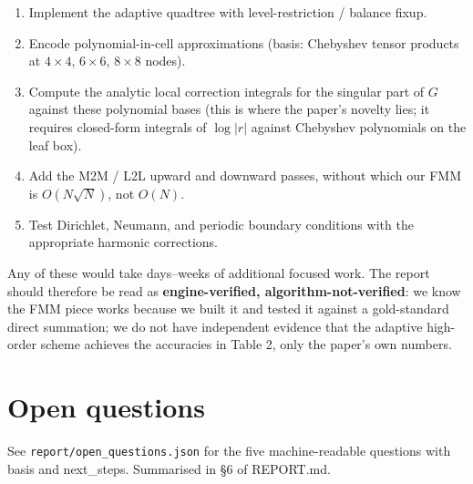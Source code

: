 \documentclass[11pt]{article}
\begin{document}
\begin{enumerate}
\item Implement the adaptive quadtree with level-restriction / balance fixup.
\item Encode polynomial-in-cell approximations (basis: Chebyshev tensor
      products at $4 \times 4$, $6 \times 6$, $8 \times 8$ nodes).
\item Compute the analytic local correction integrals for the singular
      part of $G$ against these polynomial bases (this is where the paper's
      novelty lies; it requires closed-form integrals of $\log|r|$ against
      Chebyshev polynomials on the leaf box).
\item Add the M2M / L2L upward and downward passes, without which our FMM
      is $O(N\sqrt{N})$, not $O(N)$.
\item Test Dirichlet, Neumann, and periodic boundary conditions with the
      appropriate harmonic corrections.
\end{enumerate}

Any of these would take days--weeks of additional focused work. The report
should therefore be read as \textbf{engine-verified, algorithm-not-verified}:
we know the FMM piece works because we built it and tested it against a
gold-standard direct summation; we do not have independent evidence that the
adaptive high-order scheme achieves the accuracies in Table 2, only the
paper's own numbers.

\section{Open questions}

See \texttt{report/open\_questions.json} for the five machine-readable
questions with basis and next\_steps. Summarised in \S 6 of REPORT.md.
\end{document}
